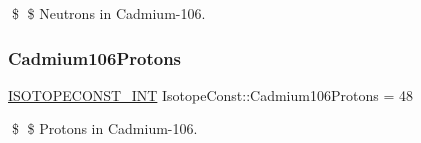 \$ \$ Neutrons in Cadmium-\/106. \mbox{\label{group___isotope_const-_cadmium-_cd106_gacccfb22657e92de20964d5930750e000}} 
\subsubsection{\texorpdfstring{Cadmium106\+Protons}{Cadmium106Protons}}
{\footnotesize\ttfamily \mbox{\hyperlink{group___isotope_const-_macros_ga5f18360b3e99483a35c32d789e62621c}{I\+S\+O\+T\+O\+P\+E\+C\+O\+N\+S\+T\+\_\+\+I\+NT}} Isotope\+Const\+::\+Cadmium106\+Protons = 48}

\$ \$ Protons in Cadmium-\/106. 